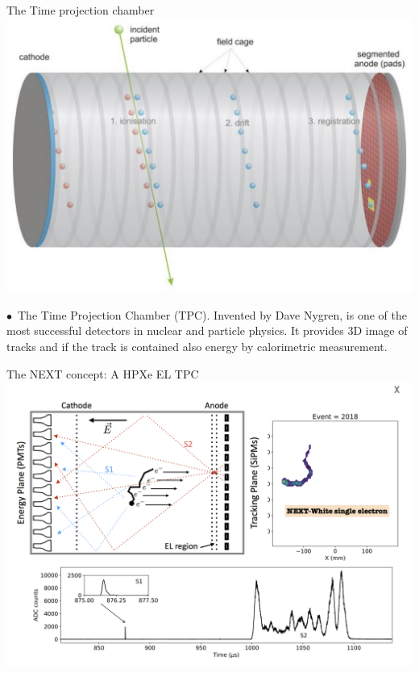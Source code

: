 \documentclass [aspectratio=169]{beamer}
\begin{document}

\begin{frame}{The Time projection chamber}
\includegraphics[scale=0.42]{tpc.png}

$\bullet$~The Time Projection Chamber (TPC). Invented by Dave Nygren, is one of the most successful detectors in nuclear and particle physics. 
It provides 3D image of tracks and if the track is contained also energy by calorimetric measurement. 
\end{frame}

\begin{frame}{The NEXT concept: A HPXe EL TPC}
\includegraphics[scale=0.30]{nextpo.png}
 
\end{frame}
\end{document}
